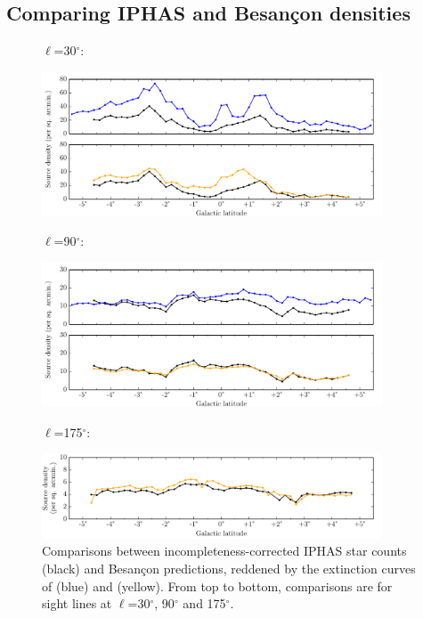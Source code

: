 \documentclass[a4paper,useAMS,usenatbib]{mn2e}
\begin{document}
\subsection{Comparing IPHAS and Besan\c{c}on densities}
\begin{figure}
\begin{center}
\begin{flushleft}
\Large{$\ell$=30$^{\circ}$:}
\end{flushleft}

\includegraphics[width=0.9\textwidth]{figures/count_comparison_30.pdf} 

\begin{flushleft}
\Large{$\ell$=90$^{\circ}$:}
\end{flushleft}

\includegraphics[width=0.9\textwidth]{figures/count_comparison_89.pdf}

\begin{flushleft}
\Large{$\ell$=175$^{\circ}$:}
\end{flushleft}

\includegraphics[width=0.9\textwidth]{figures/count_comparison_174.pdf} 
\caption{\footnotesize Comparisons between incompleteness-corrected IPHAS star counts (black) and Besan\c{c}on predictions, reddened by the extinction curves of \citet{Marshall2004} (blue) and \citet{Sale2014} (yellow). From top to bottom, comparisons are for sight lines at $\ell$=30$^{\circ}$, 90$^{\circ}$ and 175$^{\circ}$.}
\label{fig:count_comparison}
\end{center}
\end{figure}
\end{document}

